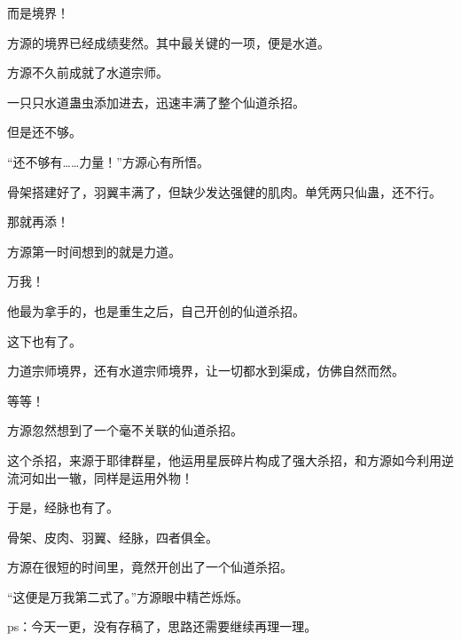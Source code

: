 \begin{this_body}
而是境界！

方源的境界已经成绩斐然。其中最关键的一项，便是水道。

方源不久前成就了水道宗师。

一只只水道蛊虫添加进去，迅速丰满了整个仙道杀招。

但是还不够。

“还不够有……力量！”方源心有所悟。

骨架搭建好了，羽翼丰满了，但缺少发达强健的肌肉。单凭两只仙蛊，还不行。

那就再添！

方源第一时间想到的就是力道。

万我！

他最为拿手的，也是重生之后，自己开创的仙道杀招。

这下也有了。

力道宗师境界，还有水道宗师境界，让一切都水到渠成，仿佛自然而然。

等等！

方源忽然想到了一个毫不关联的仙道杀招。

这个杀招，来源于耶律群星，他运用星辰碎片构成了强大杀招，和方源如今利用逆流河如出一辙，同样是运用外物！

于是，经脉也有了。

骨架、皮肉、羽翼、经脉，四者俱全。

方源在很短的时间里，竟然开创出了一个仙道杀招。

“这便是万我第二式了。”方源眼中精芒烁烁。

ps：今天一更，没有存稿了，思路还需要继续再理一理。

\end{this_body}

